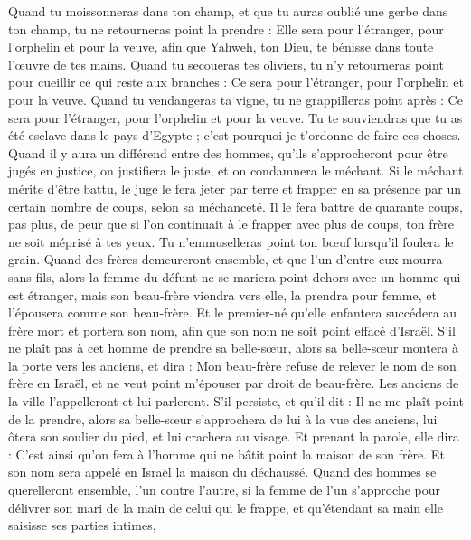 \begin{multicols}{2}
Quand tu moissonneras dans ton champ, et que tu auras oublié une gerbe dans ton champ, tu ne retourneras point la prendre : Elle sera pour l'étranger, pour l'orphelin et pour la veuve, afin que Yahweh, ton Dieu, te bénisse dans toute l’œuvre de tes mains.
Quand tu secoueras tes oliviers, tu n'y retourneras point pour cueillir ce qui reste aux branches : Ce sera pour l'étranger, pour l'orphelin et pour la veuve.
Quand tu vendangeras ta vigne, tu ne grappilleras point après : Ce sera pour l'étranger, pour l'orphelin et pour la veuve.
Tu te souviendras que tu as été esclave dans le pays d'Egypte ; c'est pourquoi je t’ordonne de faire ces choses.
\VerseOne{}Quand il y aura un différend entre des hommes, qu'ils s’approcheront pour être jugés en justice, on justifiera le juste, et on condamnera le méchant.
Si le méchant mérite d'être battu, le juge le fera jeter par terre et frapper en sa présence par un certain nombre de coups, selon sa méchanceté.
Il le fera battre de quarante coups, pas plus, de peur que si l’on continuait à le frapper avec plus de coups, ton frère ne soit méprisé à tes yeux.
Tu n'emmuselleras point ton bœuf lorsqu'il foulera le grain.
Quand des frères demeureront ensemble, et que l'un d'entre eux mourra sans fils, alors la femme du défunt ne se mariera point dehors avec un homme qui est étranger, mais son beau-frère viendra vers elle, la prendra pour femme, et l'épousera comme son beau-frère.
Et le premier-né qu'elle enfantera succédera au frère mort et portera son nom, afin que son nom ne soit point effacé d'Israël.
S'il ne plaît pas à cet homme de prendre sa belle-sœur, alors sa belle-sœur montera à la porte vers les anciens, et dira : Mon beau-frère refuse de relever le nom de son frère en Israël, et ne veut point m'épouser par droit de beau-frère.
Les anciens de la ville l'appelleront et lui parleront. S'il persiste, et qu'il dit : Il ne me plaît point de la prendre,
alors sa belle-sœur s'approchera de lui à la vue des anciens, lui ôtera son soulier du pied, et lui crachera au visage. Et prenant la parole, elle dira : C'est ainsi qu'on fera à l'homme qui ne bâtit point la maison de son frère.
Et son nom sera appelé en Israël la maison du déchaussé.
Quand des hommes se querelleront ensemble, l'un contre l'autre, si la femme de l'un s'approche pour délivrer son mari de la main de celui qui le frappe, et qu'étendant sa main elle saisisse ses parties intimes,

\end{multicols}

